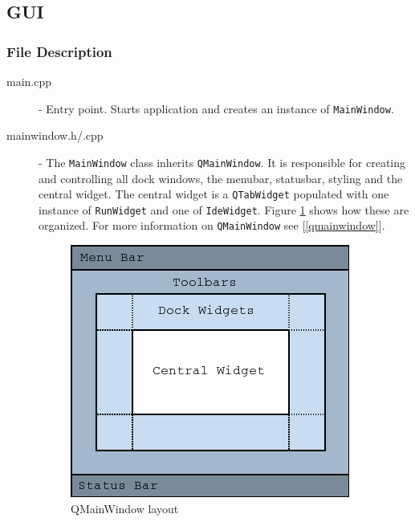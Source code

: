 \subsection{GUI}
\subsubsection{File Description}
\begin{description}
\item[main.cpp] - Entry point. Starts application and creates an instance of \texttt{MainWindow}. 

\item [mainwindow.h/.cpp] - The \texttt{MainWindow} class inherits \texttt{QMainWindow}. It is responsible for creating and controlling all dock windows, the menubar, statusbar, styling and the central widget. The central widget is a \texttt{QTabWidget} populated with one instance of \texttt{RunWidget} and one of \texttt{IdeWidget}. Figure \ref{fig:qmainwindowlayout} shows how these are organized. For more information on \texttt{QMainWindow} see [\ref{qmainwindow}].

\begin{figure}[H]
\centering
\includegraphics[scale=0.5]{img/mainwindowlayout.png}
\caption{QMainWindow layout \cite{qmainwindow}}
\label{fig:qmainwindowlayout}
\end{figure}



\end{description}
